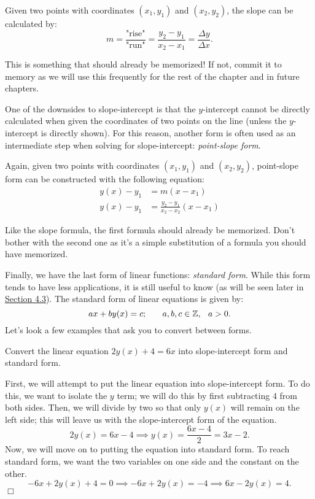 \documentclass[../book.tex]{subfiles}
\begin{document}
Given two points with coordinates $(x_1,y_1)$ and $(x_2,y_2)$, the slope can be calculated by: $$m=\dfrac{\text{"rise"}}{\text{"run"}}=\dfrac{y_2-y_1}{x_2-x_1}=\dfrac{\Delta y}{\Delta x}.$$
\begin{note}
This is something that should already be memorized!  If not, commit it to memory as we will use this frequently for the rest of the chapter and in future chapters.
\end{note}
One of the downsides to slope-intercept is that the $y$-intercept cannot be directly calculated when given the coordinates of two points on the line (unless the $y$-intercept is directly shown).  For this reason, another form is often used as an intermediate step when solving for slope-intercept: \textit{point-slope form}.  

Again, given two points with coordinates $(x_1,y_1)$ and $(x_2,y_2)$, point-slope form can be constructed with the following equation: \begin{align*}
    y(x)-y_1&=m\left(x-x_1\right) \\ 
    y(x)-y_1&=\frac{y_2-y_1}{x_2-x_2}\left(x-x_1\right)
\end{align*}
\begin{note}
Like the slope formula, the first formula should already be memorized.  Don't bother with the second one as it's a simple substitution of a formula you should have memorized.
\end{note}
Finally, we have the last form of linear functions: \textit{standard form}.  While this form tends to have less applications, it is still useful to know (as will be seen later in \hyperlink{section.4.3}{Section 4.3}).  The standard form of linear equations is given by: $$ax+by(x)=c; \hspace{0.25in} a,b,c\in\mathbb{Z}, \hspace{0.10in} a>0.$$
Let's look a few examples that ask you to convert between forms.
\begin{example}
Convert the linear equation $2y(x)+4=6x$ into slope-intercept form and standard form.
\end{example}
\begin{solution}
First, we will attempt to put the linear equation into slope-intercept form.  To do this, we want to isolate the $y$ term; we will do this by first subtracting $4$ from both sides.  Then, we will divide by two so that only $y(x)$ will remain on the left side; this will leave us with the slope-intercept form of the equation.  $$2y(x)=6x-4 \implies y(x)=\dfrac{6x-4}{2}=3x-2.$$
Now, we will move on to putting the equation into standard form.  To reach standard form, we want the two variables on one side and the constant on the other.
$$-6x+2y(x)+4=0 \implies -6x+2y(x)=-4 \implies 6x-2y(x)=4.$$ $\Box$
\end{solution}
\end{document}

